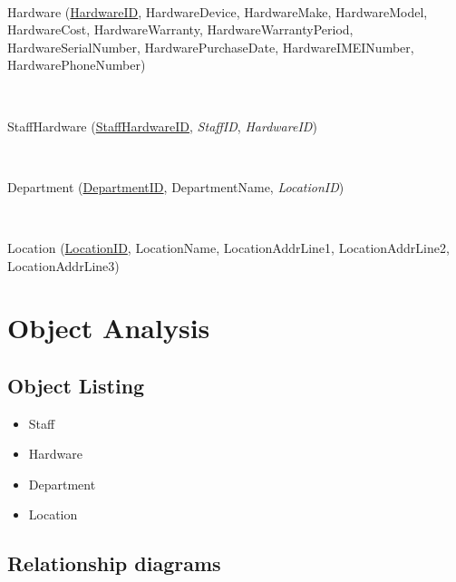\

\begin{center}
Hardware  (\underline{HardwareID}, HardwareDevice, HardwareMake, HardwareModel,\\ HardwareCost, HardwareWarranty, HardwareWarrantyPeriod,\\ HardwareSerialNumber, HardwarePurchaseDate, HardwareIMEINumber, \\HardwarePhoneNumber)
\end{center}

\

\begin{center}
StaffHardware  (\underline{StaffHardwareID}, \textit{ StaffID}, \textit{ HardwareID})
\end{center}

\

\begin{center}
Department  (\underline{DepartmentID}, DepartmentName, \textit{ LocationID})
\end{center}

\

\begin{center}
Location  (\underline{LocationID}, LocationName, LocationAddrLine1, LocationAddrLine2, LocationAddrLine3)
\end{center}



\section{Object Analysis}

\subsection{Object Listing}

\begin{itemize}
\item Staff
\item Hardware
\item Department
\item Location
\end{itemize}

\subsection{Relationship diagrams}

